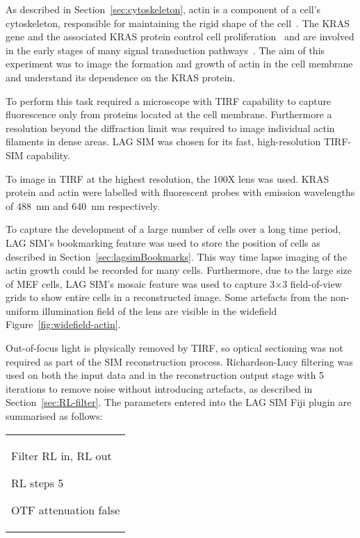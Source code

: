 As described in Section~\ref{sec:cytoskeleton}, actin is a component of a cell's cytoskeleton, responsible for maintaining the rigid shape of the cell~\cite{alberts2013essential}.
The KRAS gene and the associated KRAS protein control cell proliferation~\cite{zimmermann2013small} and are involved in the early stages of many signal transduction pathways~\cite{downward2003targeting, kranenburg2005kras}.
The aim of this experiment was to image the formation and growth of actin in the cell membrane and understand its dependence on the KRAS protein.

To perform this task required a microscope with TIRF capability to capture fluorescence only from proteins located at the cell membrane.
Furthermore a resolution beyond the diffraction limit was required to image individual actin filaments in dense areas.
LAG SIM was chosen for its fast, high-resolution TIRF-SIM capability.

To image in TIRF at the highest resolution, the 100X  lens was used.
KRAS protein and actin were labelled with fluorescent probes with emission wavelengths of \SI{488}{\nano\metre} and \SI{640}{\nano\metre} respectively.

To capture the development of a large number of cells over a long time period, LAG SIM's bookmarking feature was used to store the position of cells as described in Section~\ref{sec:lagsimBookmarks}.
This way time lapse imaging of the actin growth could be recorded for many cells.
Furthermore, due to the large size of MEF cells, LAG SIM's mosaic feature was used to capture 3$\times$3 field-of-view grids to show entire cells in a reconstructed image.
Some artefacts from the non-uniform illumination field of the lens are visible in the widefield Figure~\ref{fig:widefield-actin}. 

Out-of-focus light is physically removed by TIRF, so optical sectioning was not required as part of the SIM reconstruction process.
Richardson-Lucy filtering was used on both the input data and in the reconstruction output stage with 5 iterations to remove noise without introducing artefacts, as described in Section~\ref{sec:RL-filter}.
The parameters entered into the LAG SIM Fiji plugin are summarised as follows: \newline
\begin{tabular}{p{}}
\begin{labelling}[margin=OTF attenuation]
	\item[Filter] RL in, RL out
	\item[RL steps] 5
	\item[OTF attenuation] false
\end{labelling}
\end{tabular}

